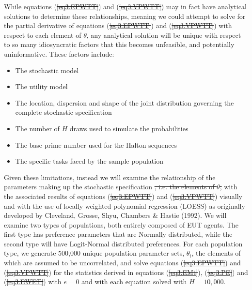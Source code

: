 \documentclass[11pt,a4paper]{article} %
\providecommand{\DIFaddtex}[1]{{\protect\color{blue}\uwave{#1}}} %
\providecommand{\DIFdeltex}[1]{{\protect\color{red}\sout{#1}}}                      %
\providecommand{\DIFaddbegin}{} %
\providecommand{\DIFaddend}{} %
\providecommand{\DIFdelbegin}{} %
\providecommand{\DIFdelend}{} %
\providecommand{\DIFadd}[1]{\texorpdfstring{\DIFaddtex{#1}}{#1}} %
\providecommand{\DIFdel}[1]{\texorpdfstring{\DIFdeltex{#1}}{}} %
\newcommand{\DIFscaledelfig}{0.5}
\newlength{\DIFdelgraphicswidth} %
\newlength{\DIFdelgraphicsheight} %
\newcommand{\DIFaddincludegraphics}[2][]{{\color{blue}\fbox{\DIFOincludegraphics[#1]{#2}}}} %
\newcommand{\DIFdelincludegraphics}[2][]{%
\sbox{\DIFdelgraphicsbox}{\DIFOincludegraphics[#1]{#2}}%
\settoboxwidth{\DIFdelgraphicswidth}{\DIFdelgraphicsbox} %
\settoboxtotalheight{\DIFdelgraphicsheight}{\DIFdelgraphicsbox} %
\scalebox{\DIFscaledelfig}{%
\parbox[b]{\DIFdelgraphicswidth}{\usebox{\DIFdelgraphicsbox}\\[-\baselineskip] \rule{\DIFdelgraphicswidth}{0em}}\llap{\resizebox{\DIFdelgraphicswidth}{\DIFdelgraphicsheight}{%
\setlength{\unitlength}{\DIFdelgraphicswidth}%
\begin{picture}(1,1)%
\thicklines\linethickness{2pt} %
{\color[rgb]{1,0,0}\put(0,0){\framebox(1,1){}}}%
{\color[rgb]{1,0,0}\put(0,0){\line( 1,1){1}}}%
{\color[rgb]{1,0,0}\put(0,1){\line(1,-1){1}}}%
\end{picture}%
}\hspace*{3pt}}} %
} %
\DeclareRobustCommand{\DIFaddbegin}{\DIFOaddbegin \let\includegraphics\DIFaddincludegraphics} %
\DeclareRobustCommand{\DIFaddend}{\DIFOaddend \let\includegraphics\DIFOincludegraphics} %
\DeclareRobustCommand{\DIFdelbegin}{\DIFOdelbegin \let\includegraphics\DIFdelincludegraphics} %
\DeclareRobustCommand{\DIFdelend}{\DIFOaddend \let\includegraphics\DIFOincludegraphics} %
\begin{document}
While equations (\DIFdelbegin \DIFdel{\ref{eq3:EPWTT}}\DIFdelend \DIFaddbegin \DIFadd{\ref{eq:EPWTT}}\DIFaddend ) and (\DIFdelbegin \DIFdel{\ref{eq3:VPWTT}}\DIFdelend \DIFaddbegin \DIFadd{\ref{eq:VPWTT}}\DIFaddend ) may in fact have analytical solutions to determine these relationships, meaning we could attempt to solve for the partial derivative of equations (\DIFdelbegin \DIFdel{\ref{eq3:EPWTT}}\DIFdelend \DIFaddbegin \DIFadd{\ref{eq:EPWTT}}\DIFaddend ) and (\DIFdelbegin \DIFdel{\ref{eq3:VPWTT}}\DIFdelend \DIFaddbegin \DIFadd{\ref{eq:VPWTT}}\DIFaddend ) with respect to each element of $\theta$, any analytical solution will be unique with respect to so many idiosyncratic factors that this becomes unfeasible, and potentially uninformative.
These factors include:
\begin{itemize}
 \setlength\itemsep{-.25em}
	\item The stochastic model
	\item The utility model
	\item The location, dispersion and shape of the joint distribution governing the complete stochastic specification
	\item The number of $H$ draws used to simulate the probabilities
	\item The base prime number used for the Halton sequences
	\item The specific tasks faced by the sample population
\end{itemize}

Given these limitations, instead we will examine the relationship of the parameters making up the stochastic specification \DIFdelbegin \DIFdel{, i.e. the elements of $\theta$, }\DIFdelend with the associated results of equations (\DIFdelbegin \DIFdel{\ref{eq3:EPWTT}}\DIFdelend \DIFaddbegin \DIFadd{\ref{eq:EPWTT}}\DIFaddend ) and (\DIFdelbegin \DIFdel{\ref{eq3:VPWTT}}\DIFdelend \DIFaddbegin \DIFadd{\ref{eq:VPWTT}}\DIFaddend ) visually and with the use of locally weighted polynomial regression (LOESS) as originally developed by Cleveland, Grosse, Shyu, Chambers \& Hastie (1992).
We will examine two types of populations, both entirely composed of EUT agents.
The first type has preference parameters that are Normally distributed, while the second type will have Logit-Normal distributed preferences.
For each population type, we generate 500,000 unique population parameter sets, $\theta_i$, the elements of which are assumed to be uncorrelated, and solve equations (\DIFdelbegin \DIFdel{\ref{eq3:EPWTT}}\DIFdelend \DIFaddbegin \DIFadd{\ref{eq:EPWTT}}\DIFaddend ) and (\DIFdelbegin \DIFdel{\ref{eq3:VPWTT}}\DIFdelend \DIFaddbegin \DIFadd{\ref{eq:VPWTT}}\DIFaddend ) for the statistics derived in equations (\DIFdelbegin \DIFdel{\ref{eq3:EMt}}\DIFdelend \DIFaddbegin \DIFadd{\ref{eq:EMt}}\DIFaddend ), (\DIFdelbegin \DIFdel{\ref{eq3:PE}}\DIFdelend \DIFaddbegin \DIFadd{\ref{eq:PE}}\DIFaddend ) and (\DIFdelbegin \DIFdel{\ref{eq3:EWET}}\DIFdelend \DIFaddbegin \DIFadd{\ref{eq:EPWT}}\DIFaddend ) with $e=0$ and with each equation solved with $H=10,000$.
\end{document}
